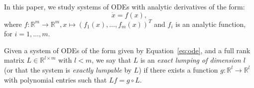 
In this paper, we study systems of ODEs with analytic derivatives of the form:
\begin{equation}
	\dot{x}  = f(x), \label{eq:ode}
\end{equation}
where $f: \mathbb{R}^{m} \to \mathbb{R}^{m}, x\mapsto (f_{1}(x), \dots, f_{m}(x))^{T}$ and $f_{i}$ is an analytic function,  for $i=1,\dots, m$.

\begin{definition}\label{def:lump}
	Given a system of ODEs of the form given by Equation~\eqref{eq:ode}, and a full rank matrix $L\in \mathbb{R}^{l\times m}$ with $l< m$,
	we say that $L$ is an \emph{exact lumping of dimension $l$} (or that the system is \emph{exactly lumpable} by $L$) if there exists a function $g: \mathbb{R}^{l} \to \mathbb{R}^{l}$ with polynomial entries such that $Lf = g\circ L$.
\end{definition}


